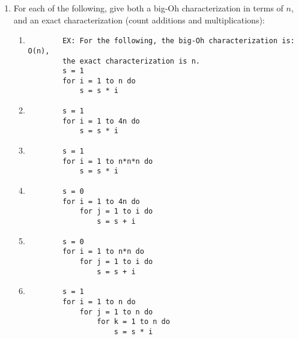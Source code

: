 \documentclass[11pt]{article}
\begin{document}
\begin{enumerate}[leftmargin=*]
\item For each of the following, give both a big-Oh characterization in terms of $n$, and an exact characterization (count additions and multiplications):
        \begin{enumerate}
        \item
        \begin{verbatim}
        EX: For the following, the big-Oh characterization is: O(n), 
        the exact characterization is n.
        s = 1
        for i = 1 to n do
            s = s * i
        \end{verbatim}
        \item
        \begin{verbatim}
        s = 1
        for i = 1 to 4n do
            s = s * i
        \end{verbatim}
        \item
        \begin{verbatim}
        s = 1
        for i = 1 to n*n*n do
            s = s * i
        \end{verbatim}
        \item
        \begin{verbatim}
        s = 0
        for i = 1 to 4n do
            for j = 1 to i do
                s = s + i
        \end{verbatim}
        \item
        \begin{verbatim}
        s = 0
        for i = 1 to n*n do
            for j = 1 to i do
                s = s + i
        \end{verbatim}
        \item
        \begin{verbatim}
        s = 1
        for i = 1 to n do
            for j = 1 to n do
                for k = 1 to n do
                    s = s * i
        \end{verbatim}
    \end{enumerate}

\end{enumerate}

\label{r:lastpage}
\end{document}
